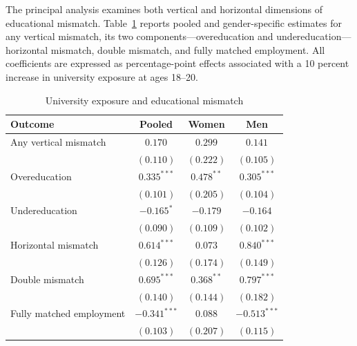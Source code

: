 The principal analysis examines both vertical and horizontal dimensions of educational mismatch. Table~\ref{tab:mismatch} reports pooled and gender-specific estimates for any vertical mismatch, its two components---overeducation and undereducation---horizontal mismatch, double mismatch, and fully matched employment. All coefficients are expressed as percentage-point effects associated with a 10 percent increase in university exposure at ages 18--20.

\begin{table}[htbp]
  \centering
  \caption{University exposure and educational mismatch}
  \label{tab:mismatch}
  \begin{threeparttable}
  \begin{tabular}{lccc}
    \toprule
    Outcome & Pooled & Women & Men \\
    \midrule
    Any vertical mismatch     & $0.170$          & $0.299$          & $0.141$ \\
                              & $(0.110)$        & $(0.222)$        & $(0.105)$ \\
    Overeducation             & $0.335^{***}$    & $0.478^{**}$     & $0.305^{***}$ \\
                              & $(0.101)$        & $(0.205)$        & $(0.104)$ \\
    Undereducation            & $-0.165^{*}$     & $-0.179$         & $-0.164$ \\
                              & $(0.090)$        & $(0.109)$        & $(0.102)$ \\
    Horizontal mismatch       & $0.614^{***}$    & $0.073$          & $0.840^{***}$ \\
                              & $(0.126)$        & $(0.174)$        & $(0.149)$ \\
    Double mismatch           & $0.695^{***}$    & $0.368^{**}$     & $0.797^{***}$ \\
                              & $(0.140)$        & $(0.144)$        & $(0.182)$ \\
    Fully matched employment  & $-0.341^{***}$   & $0.088$          & $-0.513^{***}$ \\
                              & $(0.103)$        & $(0.207)$        & $(0.115)$ \\
    \bottomrule
  \end{tabular}
  \begin{tablenotes}[flushleft]
    \footnotesize

\end{tablenotes}
\end{threeparttable}
\end{table}
